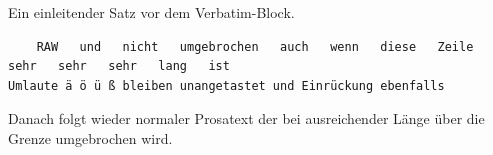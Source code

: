 Ein einleitender Satz vor dem Verbatim-Block.
\begin{verbatim}
    RAW   und   nicht   umgebrochen   auch   wenn   diese   Zeile   sehr   sehr   sehr   lang   ist
Umlaute ä ö ü ß bleiben unangetastet und Einrückung ebenfalls
\end{verbatim}
Danach folgt wieder normaler Prosatext der bei ausreichender Länge über die Grenze umgebrochen wird.
